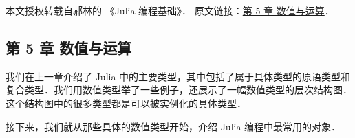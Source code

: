 
本文授权转载自郝林的 《Julia 编程基础》． 原文链接：\href{https://github.com/hyper0x/JuliaBasics/blob/master/book/ch05.md}{第 5 章 数值与运算}．


\subsection{第 5 章 数值与运算}

我们在上一章介绍了 Julia 中的主要类型，其中包括了属于具体类型的原语类型和复合类型．我们用数值类型举了一些例子，还展示了一幅数值类型的层次结构图．这个结构图中的很多类型都是可以被实例化的具体类型．

接下来，我们就从那些具体的数值类型开始，介绍 Julia 编程中最常用的对象．